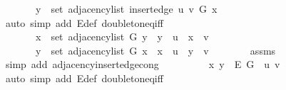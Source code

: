 \begin{isabellebody}
\ \ \ \ \ \ \ y\ {\isasymin}\ set\ {\isacharparenleft}{\kern0pt}adjacency{\isacharunderscore}{\kern0pt}list\ {\isacharparenleft}{\kern0pt}insert{\isacharunderscore}{\kern0pt}edge\ u\ v\ G{\isacharparenright}{\kern0pt}\ x{\isacharparenright}{\kern0pt}{\isachardoublequoteclose}\isanewline
\ \ \ \ \ \ \isamarkupfalse%
\ {\isacharparenleft}{\kern0pt}auto\ simp\ add{\isacharcolon}{\kern0pt}\ E{\isacharunderscore}{\kern0pt}def\ doubleton{\isacharunderscore}{\kern0pt}eq{\isacharunderscore}{\kern0pt}iff{\isacharparenright}{\kern0pt}\isanewline
\ \ \ \ \isamarkupfalse%
\ \isamarkupfalse%
\isanewline
\ \ \ \ \ \ {\isachardoublequoteopen}{\isachardot}{\kern0pt}{\isachardot}{\kern0pt}{\isachardot}{\kern0pt}\ {\isasymlongleftrightarrow}\isanewline
\ \ \ \ \ \ \ x\ {\isasymin}\ set\ {\isacharparenleft}{\kern0pt}adjacency{\isacharunderscore}{\kern0pt}list\ G\ y{\isacharparenright}{\kern0pt}\ {\isasymor}\ {\isacharparenleft}{\kern0pt}y\ {\isacharequal}{\kern0pt}\ u\ {\isasymand}\ x\ {\isacharequal}{\kern0pt}\ v{\isacharparenright}{\kern0pt}\ {\isasymor}\isanewline
\ \ \ \ \ \ \ y\ {\isasymin}\ set\ {\isacharparenleft}{\kern0pt}adjacency{\isacharunderscore}{\kern0pt}list\ G\ x{\isacharparenright}{\kern0pt}\ {\isasymor}\ {\isacharparenleft}{\kern0pt}x\ {\isacharequal}{\kern0pt}\ u\ {\isasymand}\ y\ {\isacharequal}{\kern0pt}\ v{\isacharparenright}{\kern0pt}{\isachardoublequoteclose}\isanewline
\ \ \ \ \ \ \isamarkupfalse%
\ assms\isanewline
\ \ \ \ \ \ \isamarkupfalse%
\ {\isacharparenleft}{\kern0pt}simp\ add{\isacharcolon}{\kern0pt}\ adjacency{\isacharunderscore}{\kern0pt}insert{\isacharunderscore}{\kern0pt}edge{\isacharunderscore}{\kern0pt}cong{\isacharparenright}{\kern0pt}\isanewline
\ \ \ \ \isamarkupfalse%
\ \isamarkupfalse%
\ {\isachardoublequoteopen}{\isachardot}{\kern0pt}{\isachardot}{\kern0pt}{\isachardot}{\kern0pt}\ {\isasymlongleftrightarrow}\ {\isacharbraceleft}{\kern0pt}x{\isacharcomma}{\kern0pt}\ y{\isacharbraceright}{\kern0pt}\ {\isasymin}\ E\ G\ {\isasymunion}\ {\isacharbraceleft}{\kern0pt}{\isacharbraceleft}{\kern0pt}u{\isacharcomma}{\kern0pt}\ v{\isacharbraceright}{\kern0pt}{\isacharbraceright}{\kern0pt}{\isachardoublequoteclose}\isanewline
\ \ \ \ \ \ \isamarkupfalse%
\ {\isacharparenleft}{\kern0pt}auto\ simp\ add{\isacharcolon}{\kern0pt}\ E{\isacharunderscore}{\kern0pt}def\ doubleton{\isacharunderscore}{\kern0pt}eq{\isacharunderscore}{\kern0pt}iff{\isacharparenright}{\kern0pt}\isanewline
\ \ \ \ \isamarkupfalse%

\end{isabellebody}
